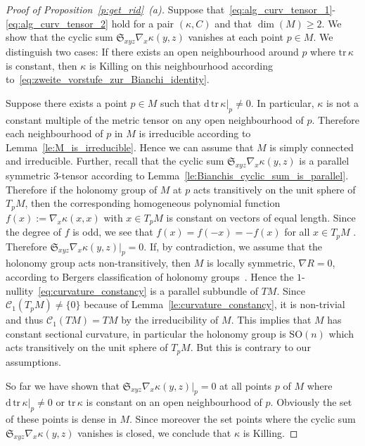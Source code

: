\documentclass[11pt,a4paper]{article}
\theoremstyle{plain}
\theoremstyle{remark}
\newcommand{\SO}{\mathrm{SO}}
\newcommand{\cyclic}{\mathfrak{S}}
\renewcommand{\d}{\mathrm{d}}
\newcommand{\trace}{\mathrm{tr}}
\newcommand{\scrC}{\mathcal{C}}
\begin{document}
\begin{proof} [Proof of Proposition~\ref{p:get_rid}~(a)]
Suppose that~\eqref{eq:alg_curv_tensor_1}-\eqref{eq:alg_curv_tensor_2} hold for a pair $(\kappa,C)$ and that $\dim(M)\geq 2$. 
We show that the cyclic sum $\cyclic_{xyz} \nabla_x\kappa(y,z)$ vanishes at
each point $p\in M$. We distinguish two cases:
If there exists an open neighbourhood around $p$ where $\trace \, \kappa$ is constant, then $\kappa$ is Killing on this neighbourhood according
to~\eqref{eq:zweite_vorstufe_zur_Bianchi_identity}. 

Suppose there exists a point $p\in M$ such that $\d \, \trace \, \kappa|_p\neq 0$. 
In particular, $\kappa$ is not a constant multiple of the metric tensor on any open neighbourhood of $p$.
Therefore each neighbourhood of $p$ in $M$ is irreducible according to Lemma~\ref{le:M_is_irreducible}. Hence we can assume that $M$ is simply connected and irreducible. Further, recall that the cyclic sum $\cyclic_{xyz}\nabla_x\kappa(y,z)$ is a parallel symmetric 3-tensor according to Lemma~\ref{le:Bianchis_cyclic_sum_is_parallel}. Therefore if the holonomy group of $M$ at $p$ acts transitively on the unit sphere of $T_pM$,
 then the corresponding homogeneous polynomial function $f(x) := \nabla_x\kappa(x,x)$ with $x\in T_pM$ is constant on vectors of equal length. 
Since the  degree of $f$ is odd, we see that $f(x) = f(-x) = - f(x)$ for all $x\in T_pM$ . Therefore $\cyclic_{xyz} \nabla_x\kappa(y,z)|_p = 0$. 
If, by contradiction, we assume that the holonomy group acts non-transitively, then $M$ is locally symmetric,  $\nabla R = 0$, 
according to Bergers classification of holonomy groups~\cite[5.21]{Ba}. Hence
the $1$-nullity~\eqref{eq:curvature_constancy} is a parallel  subbundle of
$TM$. Since $\scrC_1(T_pM)\neq \{0\}$ because of
Lemma~\ref{le:curvature_constancy}, it is non-trivial and thus $\scrC_1(TM) = TM$ by the irreducibility of $M$. This implies that $M$ has constant
sectional curvature, in particular the holonomy group is $\SO(n)$ which acts
transitively on the unit sphere of $T_pM$. But this is contrary to our assumptions.

So far we have shown that  $\cyclic_{xyz}\nabla_x\kappa(y,z)|_p = 0$ at
all points $p$ of $M$ where $\d \, \trace \, \kappa|_p \neq 0$ or $\trace \, \kappa$ is constant on an open neighbourhood of $p$. Obviously the set of these points is dense in $M$. Since moreover the set points where the cyclic sum $\cyclic_{xyz}\nabla_x\kappa(y,z)$ vanishes is closed, we conclude that $\kappa$ is Killing.



\end{proof}
\end{document}
